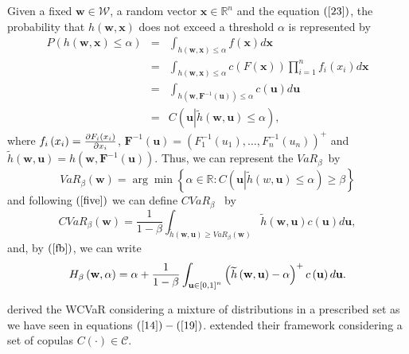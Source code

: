 \documentclass[a4paper,10pt]{article}
\begin{document}
Given a fixed $\mathbf{w\in }\mathcal{W}$, a random vector $\mathbf{x\in\mathbb{R}}^{n}$ and the equation $\left( \ref{23}\right) $, the probability that $h\left( \mathbf{w,x}\right) $ does not exceed a threshold $\alpha $ is represented by
\begin{eqnarray*}
	P\left( h\left( \mathbf{w,x}\right) \leq \alpha \right)  &=&\int_{h\left(
		\mathbf{w,x}\right) \leq \alpha }f\left( \mathbf{x}\right) d\mathbf{x} \\
	&=&\int_{h\left( \mathbf{w,x}\right) \leq \alpha }c\left( F\left( \mathbf{x}%
	\right) \right) \prod_{i=1}^{n}f_{i}\left( x_{i}\right) d\mathbf{x} \\
	&=&\int_{h\left( \mathbf{w,F}^{-1}\left( \mathbf{u}\right) \right) \leq
		\alpha }c\left( \mathbf{u}\right) d\mathbf{u} \\
	&=&C\left( \mathbf{u}\left\vert \widetilde{h}\left( \mathbf{w,u}\right) \leq
	\alpha \right. \right),
\end{eqnarray*}%
where $f_{i}\left( x_{i}\right) =\frac{\partial F_{i}\left( x_{i}\right) }{%
	\partial x_{i}}$, $\mathbf{F}^{-1}\left( \mathbf{u}\right) =\left(
F_{1}^{-1}\left( u_{1}\right),\ldots,F_{n}^{-1}\left( u_{n}\right) \right) ^{+}
$ and $\widetilde{h}\left( \mathbf{w,u}\right) =h\left( \mathbf{w,F}^{-1}\left( \mathbf{u}\right) \right)$. Thus, we can represent the $VaR_{\beta }$\thinspace\ by
\begin{equation}
VaR_{\beta }\left( \mathbf{w}\right) =\arg \min \left\{ \alpha \in \mathbb{R}:C\left( \mathbf{u}\left\vert \widetilde{h}\left( w\mathbf{,u}\right) \leq \alpha
\right. \right) \geq \beta \right\}  \label{25}
\end{equation}
and following $\left( \ref{five}\right) $ we can define $CVaR_{\beta }$ \thinspace\ by
\begin{equation}
CVaR_{\beta }\left( \mathbf{w}\right) =\frac{1}{1-\beta }\int_{\widetilde{h}\left(
	\mathbf{w,u}\right) \geq VaR_{\beta }\left( \mathbf{w}\right) }\widetilde{h}\left(
\mathbf{w,u}\right) c\left( \mathbf{u}\right) d\mathbf{u,}  \label{26}
\end{equation}
and, by $\left( \ref{fb}\right) $, we can write
\begin{equation}
H_{\beta }\left( \mathbf{w},\alpha \right) =\alpha +\frac{1}{1-\beta }\int_{%
	\mathbf{u} \in \left[ 0,1\right] ^{n}}\left( \widetilde{h}\left( \mathbf{w,u}\right)
-\alpha \right) ^{+}c\left( \mathbf{u}\right) d\mathbf{u.}  \label{27}
\end{equation}

\citet*{zhu2009worst} derived the WCVaR considering a mixture of distributions in a prescribed set as we have seen in equations $\left( \ref{14}\right) -\left( \ref{19}\right) $. \citet*{kakouris14} extended their framework considering a set of copulas $C\left( \cdot \right) \in \mathcal{C}$.
\end{document}
